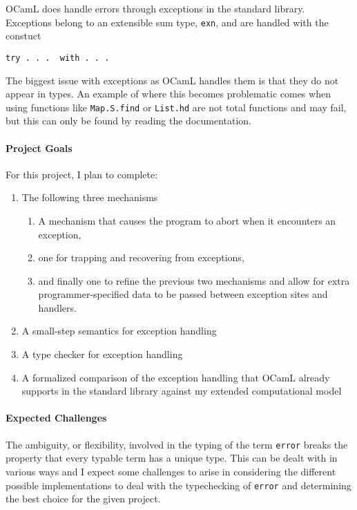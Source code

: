\documentclass{article}
\begin{document}
OCamL does handle errors through exceptions in the standard library. Exceptions
belong to an extensible sum type, \texttt{exn}, and are handled with the constuct
\begin{verbatim}
try . . .  with . . .
\end{verbatim}
The biggest issue with exceptions as OCamL handles them is that they do not appear 
in types. An example of where this becomes problematic comes when using functions 
like \texttt{Map.S.find} or \texttt{List.hd} are not total functions and may fail, but this can
only be found by reading the documentation.

\paragraph{Project Goals}

For this project, I plan to complete:
\begin{enumerate}
\item The following three mechanisms
	\begin{enumerate}
	\item A mechanism that causes the program to abort when it encounters an exception, 
	\item one for trapping and recovering from exceptions, 
	\item and finally one to refine the previous two mechanisms and allow for extra 
	programmer-specified data to be passed between exception sites and handlers.
	\end{enumerate}
\item A small-step semantics for exception handling
\item A type checker for exception handling
\item A formalized comparison of the exception handling that OCamL 
  already supports in the standard library against my extended computational
  model
\end{enumerate}

\paragraph{Expected Challenges}

The ambiguity, or flexibility, involved in the typing of the term \texttt{error} breaks the property 
that every typable term has a unique type. This can be dealt with in various ways and I expect 
some challenges to arise in considering the different possible implementations to deal with the
typechecking of \texttt{error} and determining the best choice for the given project.
\end{document}
